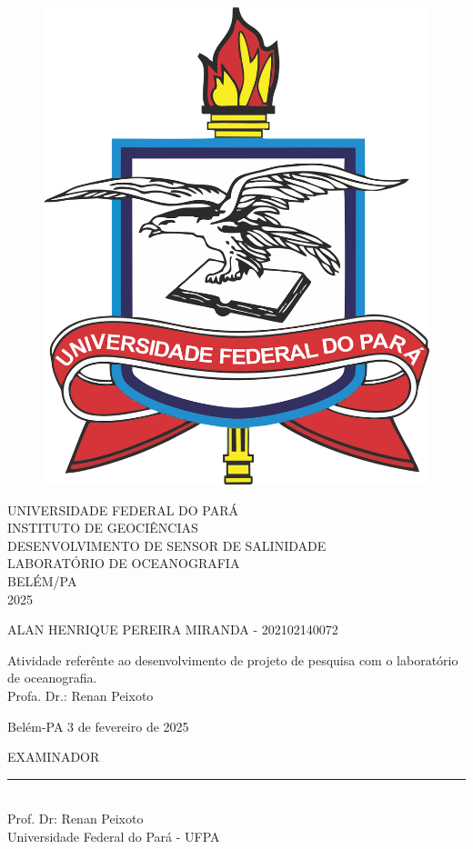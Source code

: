 \thispagestyle{empty}

\begin{center}
	\begin{figure}[h]
  \centering
		\includegraphics[width=0.21\linewidth]{images/ufpa}
		\label{fig:ufpa}
	\end{figure}


	\vspace{1cm}
	\large \uppercase{UNIVERSIDADE FEDERAL DO PARÁ}\\
	\large \uppercase{INSTITUTO DE GEOCIÊNCIAS}\\
	\vspace{7cm}
	\large \uppercase{DESENVOLVIMENTO DE SENSOR DE SALINIDADE}\\
	\vspace{1cm}
	\large \uppercase {LABORATÓRIO DE OCEANOGRAFIA} \\
	\vspace{7cm}
	\large {BELÉM/PA \\ 2025}

 \newpage
 \thispagestyle{empty}
 \large \uppercase{alan henrique pereira miranda - 202102140072}\\
 \vspace{7cm}

 \singlespacing
 \hspace{8cm} %
 \begin{minipage}{7cm}
	Atividade referênte ao desenvolvimento de projeto de pesquisa com o laboratório de oceanografia. \\

	Profa. Dr.: Renan Peixoto\\
	\vspace{1cm}

	Belém-PA 3 de fevereiro de 2025
	\vspace{4cm}
\end{minipage}

\onehalfspacing
\begin{center}

	EXAMINADOR\\
	\vspace{3cm}
	\rule{10cm}{0.15mm} \\
	Prof. Dr: Renan Peixoto\\
	Universidade Federal do Pará - UFPA
\end{center}
\newpage

\begin{center}
    \thispagestyle{empty}
	\listoffigures
	\newpage
    \thispagestyle{empty}
    \tableofcontents

\end{center}

\newpage
\thispagestyle{empty}

\end{center}